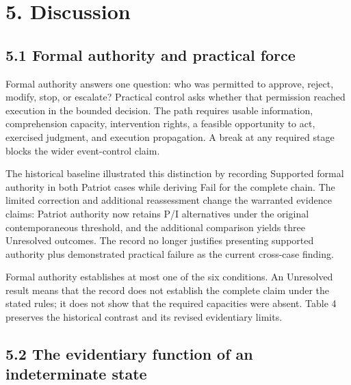 \documentclass[11pt]{article}
\begin{document}
\section*{5. Discussion}

\subsection*{5.1 Formal authority and practical force}

Formal authority answers one question: who was permitted to approve, reject, modify, stop, or escalate? Practical control asks whether that permission reached execution in the bounded decision. The path requires usable information, comprehension capacity, intervention rights, a feasible opportunity to act, exercised judgment, and execution propagation. A break at any required stage blocks the wider event-control claim.

The historical baseline illustrated this distinction by recording Supported formal authority in both Patriot cases while deriving Fail for the complete chain. The limited correction and additional reassessment change the warranted evidence claims: Patriot authority now retains P/I alternatives under the original contemporaneous threshold, and the additional comparison yields three Unresolved outcomes. The record no longer justifies presenting supported authority plus demonstrated practical failure as the current cross-case finding.

Formal authority establishes at most one of the six conditions. An Unresolved result means that the record does not establish the complete claim under the stated rules; it does not show that the required capacities were absent. Table 4 preserves the historical contrast and its revised evidentiary limits.

\subsection*{5.2 The evidentiary function of an indeterminate state}
\end{document}
